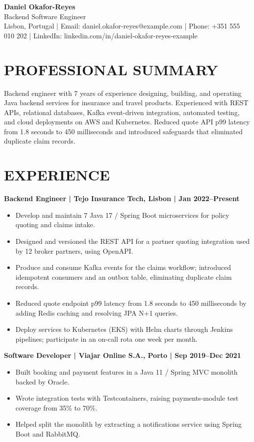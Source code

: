 \documentclass[11pt,a4paper]{article}
\begin{document}
\begin{center}
{\Huge\bfseries\color{primarycolor} Daniel Okafor-Reyes}\\[0.3em]
{\large\color{accentcolor} Backend Software Engineer}\\[0.4em]
Lisbon, Portugal | Email: daniel.okafor-reyes@example.com | Phone: +351 555 010 202 | LinkedIn: linkedin.com/in/daniel-okafor-reyes-example
\end{center}

\section*{PROFESSIONAL SUMMARY}
Backend engineer with 7 years of experience designing, building, and operating Java backend services for insurance and travel products. Experienced with REST APIs, relational databases, Kafka event-driven integration, automated testing, and cloud deployments on AWS and Kubernetes. Reduced quote API p99 latency from 1.8 seconds to 450 milliseconds and introduced safeguards that eliminated duplicate claim records.

\section*{EXPERIENCE}
\textbf{Backend Engineer | Tejo Insurance Tech, Lisbon | Jan 2022--Present}
\begin{itemize}
\item Develop and maintain 7 Java 17 / Spring Boot microservices for policy quoting and claims intake.
\item Designed and versioned the REST API for a partner quoting integration used by 12 broker partners, using OpenAPI.
\item Produce and consume Kafka events for the claims workflow; introduced idempotent consumers and an outbox table, eliminating duplicate claim records.
\item Reduced quote endpoint p99 latency from 1.8 seconds to 450 milliseconds by adding Redis caching and resolving JPA N+1 queries.
\item Deploy services to Kubernetes (EKS) with Helm charts through Jenkins pipelines; participate in an on-call rota one week per month.
\end{itemize}

\textbf{Software Developer | Viajar Online S.A., Porto | Sep 2019--Dec 2021}
\begin{itemize}
\item Built booking and payment features in a Java 11 / Spring MVC monolith backed by Oracle.
\item Wrote integration tests with Testcontainers, raising payments-module test coverage from 35\% to 70\%.
\item Helped split the monolith by extracting a notifications service using Spring Boot and RabbitMQ.
\end{itemize}
\end{document}
